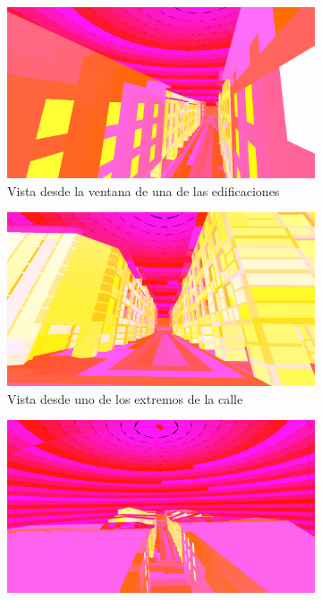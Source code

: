 \begin{figure}[H]
	\centering
	\begin{subfigure}{0.45\textwidth}
		\includegraphics[width=1\linewidth]{assets/street1}
		\caption{Vista desde la ventana de una de las edificaciones}
	\end{subfigure}
	\begin{subfigure}{0.45\textwidth}
		\includegraphics[width=1\linewidth]{assets/street2}
		\caption{Vista desde uno de los extremos de la calle}
	\end{subfigure}
	\begin{subfigure}{0.45\textwidth}
		\includegraphics[width=1\linewidth]{assets/street3}

\end{subfigure}
\end{figure}
